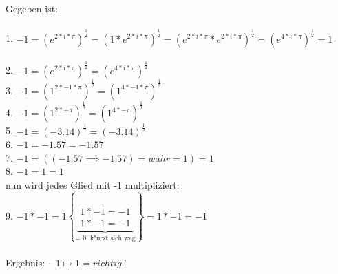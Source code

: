 \documentclass[10pt]{book}
\begin{document}
Gegeben ist:\\ \\
1. $ -1 = (e^{2 * i * \pi})^{\frac{1}{2}} = (1*e^{2 * i * \pi})^{\frac{1}{2}} = (e^{2*i*\pi}*e^{2*i*\pi})^{\frac{1}{2}}=(e^{4*i*\pi})^{\frac{1}{2}} = 1 $ \\
\\
2. $ -1 = (e^{2 * i * \pi})^{\frac{1}{2}} = (e^{4 * i * \pi})^{\frac{1}{2}} $ \\
3. $ -1 = ({1^{2 * -1 * \pi}})^{\frac{1}{2}} = (1^{4 * -1 * \pi})^{\frac{1}{2}} $ \\
4. $ -1 = (1^{2 * -\pi})^{\frac{1}{2}} = (1^{4 * - \pi})^{\frac{1}{2}} $ \\
5. $ -1 = (-3.14)^{\frac{1}{2}} = (-3.14)^{\frac{1}{2}} $ \\
6. $ -1 = -1.57 = -1.57 $ \\
7. $ -1 = ((-1.57 \implies -1.57) = wahr = 1) = 1 $ \\
8. $ -1 = 1 = 1 $ \\
nun wird jedes Glied mit -1 multipliziert: \\
9. $ -1 * -1 = 1 \left\{
  \underbrace{
  \begin{array}{l}
   1 * -1 = -1 \\
   1 * -1 = -1
  \end{array}}_{\text{= 0, k"urzt sich weg}}
  \right\} = 1 * -1 = -1 $ \\
\\
Ergebnis: $ -1 \mapsto 1 = richtig\ ! $ \\
\end{document}
